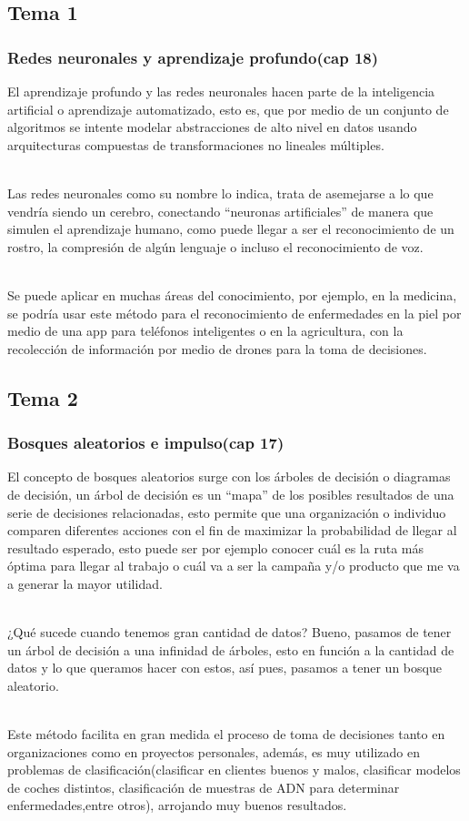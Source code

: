 \documentclass[10pt]{beamer}
\begin{document}
\subsection{Tema 1}
\begin{frame}
\frametitle{Redes neuronales y aprendizaje profundo(cap 18)}
El aprendizaje profundo y las redes neuronales hacen parte de la inteligencia artificial o aprendizaje automatizado, esto es, que por medio de un conjunto de algoritmos se intente modelar abstracciones de alto nivel en datos usando arquitecturas compuestas de transformaciones no lineales múltiples.

~\\Las redes neuronales como su nombre lo indica, trata de asemejarse a lo que vendría siendo un cerebro, conectando ``neuronas artificiales'' de manera que simulen el aprendizaje humano, como puede llegar a ser el reconocimiento de un rostro, la compresión de algún lenguaje o incluso el reconocimiento de voz. 

~\\Se puede aplicar en muchas áreas del conocimiento, por ejemplo, en la medicina, se podría usar este método para el reconocimiento de enfermedades en la piel por medio de una app para teléfonos inteligentes o en la agricultura, con la recolección de información por medio de drones para la toma de decisiones.
\end{frame}

\subsection{Tema 2}
\begin{frame}
\frametitle{Bosques aleatorios e impulso(cap 17)}
El concepto de bosques aleatorios surge con los árboles de decisión o diagramas de decisión, un árbol de decisión es un ``mapa'' de los posibles resultados de una serie de decisiones relacionadas, esto permite que una organización o individuo comparen diferentes acciones con el fin de maximizar la probabilidad de llegar al resultado esperado, esto puede ser por ejemplo conocer cuál es la ruta más óptima para llegar al trabajo o cuál va a ser la campaña y/o producto que me va a generar la mayor utilidad.

~\\¿Qué sucede cuando tenemos gran cantidad de datos? Bueno, pasamos de tener un árbol de decisión a una infinidad de árboles, esto en función a la cantidad de datos y lo que queramos hacer con estos, así pues, pasamos a tener un bosque aleatorio.

~\\Este método facilita en gran medida el proceso de toma de decisiones tanto en organizaciones como en proyectos personales, además, es muy utilizado en problemas de clasificación(clasificar en clientes buenos y malos, clasificar modelos de coches distintos, clasificación de muestras de ADN para determinar enfermedades,entre otros), arrojando muy buenos resultados.
\end{frame}
\end{document}
